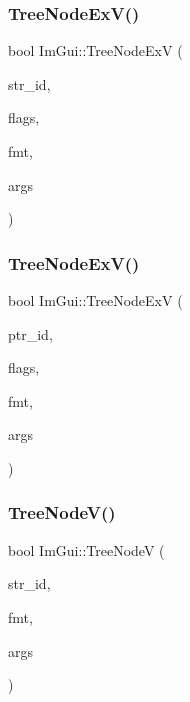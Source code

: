 \subsubsection{\texorpdfstring{Tree\+Node\+Ex\+V()}{TreeNodeExV()}\hspace{0.1cm}{\footnotesize\ttfamily [1/2]}}
{\footnotesize\ttfamily bool Im\+Gui\+::\+Tree\+Node\+ExV (\begin{DoxyParamCaption}\item[{const char $\ast$}]{str\+\_\+id,  }\item[{\mbox{\hyperlink{imgui_8h_a0588fdd10c59b49a0159484fe9ec4564}{Im\+Gui\+Tree\+Node\+Flags}}}]{flags,  }\item[{const char $\ast$}]{fmt,  }\item[{va\+\_\+list}]{args }\end{DoxyParamCaption})}

\mbox{\label{namespace_im_gui_aaae827898572d17e064a88a1afc8e6b0}} 
\subsubsection{\texorpdfstring{Tree\+Node\+Ex\+V()}{TreeNodeExV()}\hspace{0.1cm}{\footnotesize\ttfamily [2/2]}}
{\footnotesize\ttfamily bool Im\+Gui\+::\+Tree\+Node\+ExV (\begin{DoxyParamCaption}\item[{const void $\ast$}]{ptr\+\_\+id,  }\item[{\mbox{\hyperlink{imgui_8h_a0588fdd10c59b49a0159484fe9ec4564}{Im\+Gui\+Tree\+Node\+Flags}}}]{flags,  }\item[{const char $\ast$}]{fmt,  }\item[{va\+\_\+list}]{args }\end{DoxyParamCaption})}

\mbox{\label{namespace_im_gui_a9bc1075c583973d76d8d65ea89787453}} 
\subsubsection{\texorpdfstring{Tree\+Node\+V()}{TreeNodeV()}\hspace{0.1cm}{\footnotesize\ttfamily [1/2]}}
{\footnotesize\ttfamily bool Im\+Gui\+::\+Tree\+NodeV (\begin{DoxyParamCaption}\item[{const char $\ast$}]{str\+\_\+id,  }\item[{const char $\ast$}]{fmt,  }\item[{va\+\_\+list}]{args }\end{DoxyParamCaption})}

